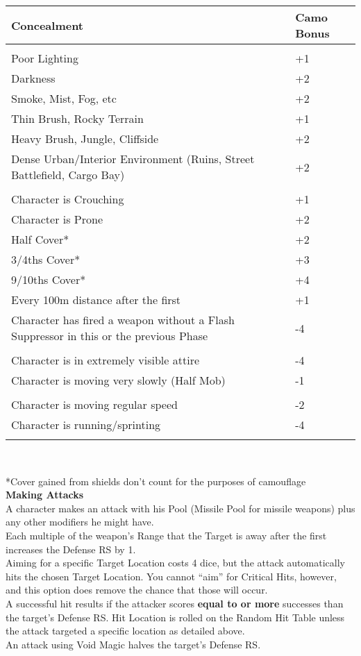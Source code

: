 \documentclass[a4paper, twocolumn, openany]{book}
\begin{document}
{{\centering
\begin{tabular}{p{6cm}p{1.2cm}}
	Concealment 				& Camo Bonus \\ \hline \\
	Poor Lighting 				& +1 \\
	Darkness 					& +2 \\
	Smoke, Mist, Fog, etc 		& +2 \\
	Thin Brush, Rocky Terrain 	& +1 \\ 
	Heavy Brush, Jungle, Cliffside & +2 \\
	Dense Urban/Interior Environment (Ruins, Street Battlefield, Cargo Bay) & +2 \\ \\ 
	Character is Crouching & +1 \\
	Character is Prone & +2 \\
	Half Cover* & +2 \\
	3/4ths Cover* & +3 \\
	9/10ths Cover* & +4 \\
	Every 100m distance after the first & +1 \\
	Character has fired a weapon without a Flash Suppressor in this or the previous Phase & -4 \\ \\
	Character is in extremely visible attire & -4 \\
	Character is moving very slowly (Half Mob) & -1 \\ \\
	Character is moving regular speed & -2 \\
	Character is running/sprinting & -4 \\

	\\ \hline
\end{tabular}\\ }
*Cover gained from shields don’t count for the purposes of camouflage\\

{\bfseries Making Attacks\\}
A character makes an attack with his Pool (Missile Pool for missile weapons) plus any other
modifiers he might have.\\
Each multiple of the weapon’s Range that the Target is away after the first increases the
Defense RS by 1.\\
Aiming for a specific Target Location costs 4 dice, but the attack automatically hits the chosen
Target Location. You cannot “aim” for Critical Hits, however, and this option does remove the
chance that those will occur.\\
A successful hit results if the attacker scores {\bfseries equal to or more} successes than the target’s
Defense RS. Hit Location is rolled on the Random Hit Table unless the attack targeted a specific
location as detailed above.\\
An attack using Void Magic halves the target’s Defense RS.\\

}
\end{document}
